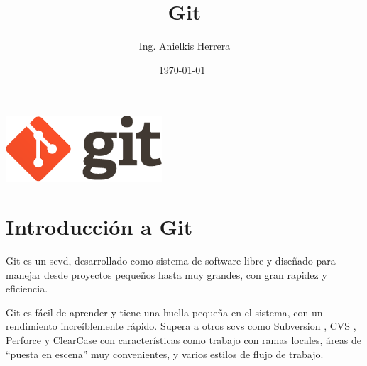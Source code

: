 \documentclass[12pt, spanish, oneside, onecolumn, a4paper]{report}
\makeatletter
\def\maketitle{%
  \null
  \thispagestyle{empty}%
  \vfill
  \begin{center}\leavevmode
    \normalfont
    \includegraphics{logo.png}\\[1cm]
    \vskip 1cm
    {\Large \@author\par}%
    \vskip 1cm
    {\Large \@date\par}%
  \end{center}%
  \vfill
  \null
  \cleardoublepage
  }
\makeatother
\begin{document}
\pagestyle{fancy}

\title{ Git }
\date{ \today\ }
\author{ Ing. Anielkis Herrera }

\maketitle


\newpage
{}


\chapter{Introducción a Git}
\label{chap:intro}





Git es un \gls{scvd}, desarrollado como sistema de software libre y diseñado para manejar desde proyectos pequeños hasta muy grandes, con gran rapidez y eficiencia.

Git es fácil de aprender y tiene una huella pequeña en el sistema, con un rendimiento increíblemente rápido. Supera a otros \glspl{scv} como Subversion , CVS , Perforce y ClearCase con características como trabajo con ramas locales, áreas de ``puesta en escena'' muy convenientes, y varios estilos de flujo de trabajo.
\end{document}
